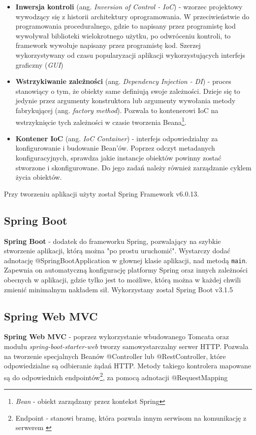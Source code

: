 \documentclass[11pt,a4paper]{article}
\begin{document}
\begin{itemize}
    \item \textbf{Inwersja kontroli} (ang. \textsl{Inversion of Control - IoC}) \cite{ioc} - wzorzec projektowy wywodzący się z historii architektury oprogramowania. W przeciwieństwie do programowania proceduralnego, gdzie to napisany przez programistę kod wywoływał biblioteki wielokrotnego użytku, po odwróceniu kontroli, to framework wywołuje napisany przez programistę kod. Szerzej wykorzystywany od czasu popularyzacji aplikacji wykorzystujących interfejs graficzny (\textsl{GUI})

    \item \textbf{Wstrzykiwanie zależności} (ang. \textsl{Dependency Injection - DI}) \cite{dependency-injection} - proces stanowiący o tym, że obiekty same definiują swoje zależności. Dzieje się to jedynie przez argumenty konstruktora lub argumenty wywołania metody fabrykującej (ang. \textsl{factory method}). Pozwala to kontenerowi IoC na wstrzyknięcie tych zależności w czasie tworzenia Beana\footnote{\textsl{Bean} - obiekt zarządzany przez kontekst Spring}.

    \item \textbf{Kontener IoC} (ang. \textsl{IoC Container}) \cite{ioc-container} - interfejs odpowiedzialny za konfigurowanie i budowanie Bean'ów. Poprzez odczyt metadanych konfiguracyjnych, sprawdza jakie instancje obiektów powinny zostać stworzone i skonfigurowane. Do jego zadań należy również zarządzanie cyklem życia obiektów.
\end{itemize}

\noindent
Przy tworzeniu aplikacji użyty został Spring Framework v6.0.13.

\subsection{Spring Boot}
\textbf{Spring Boot} \cite{spring-boot} - dodatek do frameworku Spring, pozwalający na szybkie stworzenie aplikacji, którą można "po prostu uruchomić". Wystarczy dodać adnotację \textcolor{keywordColour}{@SpringBootApplication} w głownej klasie aplikacji, nad metodą \lstinline{main}. Zapewnia on automatyczną konfigurację platformy Spring oraz innych zależności obecnych w aplikacji, gdzie tylko jest to możliwe, którą można w każdej chwili zmienić minimalnym nakładem sił. Wykorzystany został Spring Boot v3.1.5

\subsection{Spring Web MVC}
\textbf{Spring Web MVC} \cite{spring-web} - poprzez wykorzystanie wbudowanego Tomcata oraz modułu \textsl{spring-boot-starter-web} tworzy samowystarczalny serwer HTTP. Pozwala na tworzenie specjalnych Beanów \textcolor{keywordColour}{@Controller} lub \textcolor{keywordColour}{@RestController}, które odpowiedzialne są odbieranie żądań HTTP. Metody takiego kontrolera mapowane są do odpowiednich endpointów\footnote{Endpoint - stanowi bramę, która pozwala innym serwisom na komunikację z serwerem \cite{endpoint}}, za pomocą adnotacji \textcolor{keywordColour}{@RequestMapping}
\end{document}

